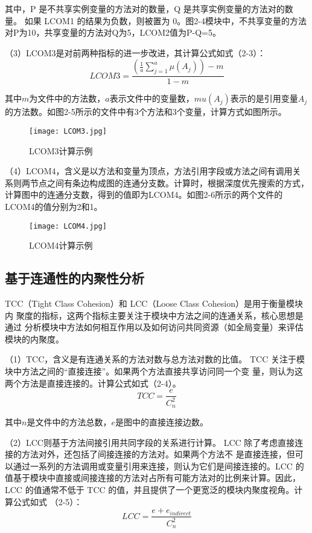 其中，P 是不共享实例变量的方法对的数量，Q 是共享实例变量的方法对的数量。
如果 LCOM1 的结果为负数，则被置为 0。图2-4模块中，不共享变量的方法对P为10，共享变量的方法对Q为5，LCOM2值为P-Q=5。

（3）LCOM3是对前两种指标的进一步改进，其计算公式如式（2-3）：
\begin{equation}
LCOM3 = \frac{\left( \frac{1}{a} \sum_{j=1}^a \mu(A_j) \right) - m}{1 - m}
\end{equation}

其中\( m\)为文件中的方法数，\( a\)表示文件中的变量数，\( mu(A_j)\)表示的是引用变量\(A_j\)的方法数。如图2-5所示的文件中有3个方法和3个变量，计算方式如图所示。
\begin{figure}[h]
\centering
\texttt{[image: LCOM3.jpg]}
\caption{LCOM3计算示例}
\end{figure}



（4）LCOM4，含义是以方法和变量为顶点，方法引用字段或方法之间有调用关系则两节点之间有条边构成图的连通分支数\cite{1995Measuring}。计算时，根据深度优先搜索的方式，计算图中的连通分支数，得到的值即为LCOM4。如图2-6所示的两个文件的LCOM4的值分别为2和1。

\begin{figure}[h]
\centering
\texttt{[image: LCOM4.jpg]}
\caption{LCOM4计算示例}
\end{figure}

\subsection{基于连通性的内聚性分析}
TCC（Tight Class Cohesion）和 LCC（Loose Class Cohesion）是用于衡量模块内
聚度的指标，这两个指标主要关注于模块中方法之间的连通关系，核心思想是通过
分析模块中方法如何相互作用以及如何访问共同资源（如全局变量）来评估模块的内聚度。


（1）TCC，含义是有连通关系的方法对数与总方法对数的比值\cite{1995Cohesion}。
TCC 关注于模块中方法之间的“直接连接”。如果两个方法直接共享访问同一个变
量，则认为这两个方法是直接连接的。计算公式如式（2-4）。
\begin{equation}
{TCC} = \frac{e}{C_{n}^{2}}
\end{equation}

其中\(n\)是文件中的方法总数，\(e\)是图中的直接连接边数。

（2）LCC则基于方法间接引用共同字段的关系进行计算\cite{1995Cohesion}。
LCC 除了考虑直接连接的方法对外，还包括了间接连接的方法对。如果两个方法不
是直接连接，但可以通过一系列的方法调用或变量引用来连接，则认为它们是间接连接的。LCC 的值基于模块中直接或间接连接的方法对占所有可能方法对的比例来计算。因此，LCC 的值通常不低于 TCC 的值，并且提供了一个更宽泛的模块内聚度视角。计算公式如式 （2-5）：
\begin{equation}
{LCC=\frac{e+e_{indirect}}{C_{n}^{2}}}
\end{equation}


